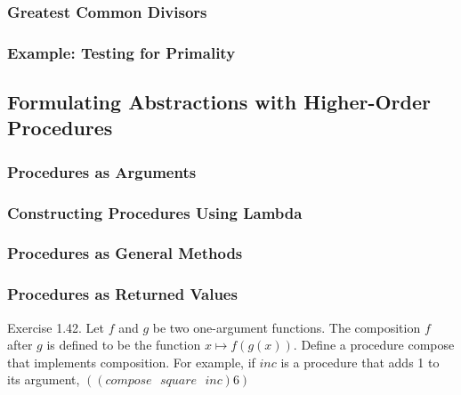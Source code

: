             \subsubsection{Greatest Common Divisors}
            \subsubsection{Example: Testing for Primality}
        \subsection{Formulating Abstractions with Higher-Order Procedures}
            \subsubsection{Procedures as Arguments}
            \subsubsection{Constructing Procedures Using Lambda}
            \subsubsection{Procedures as General Methods}
            \subsubsection{Procedures as Returned Values}
Exercise 1.42. Let $f$ and $g$ be two one-argument functions. The composition $f$ after $g$ is defined to be the function $x \mapsto f\left(g\left(x\right)\right)$. Define a procedure compose that implements composition. For example, if $inc$ is a procedure that adds 1 to its argument, $\left(\left(compose\mbox{ }square\mbox{ }inc\right) 6\right)$


